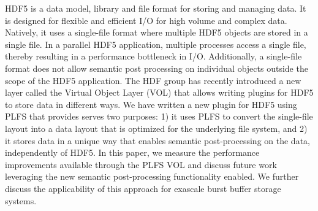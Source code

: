 HDF5 is a data model, library and file format for storing and managing data. It is designed for flexible and efficient I/O for high volume and complex data. Natively, it uses a single-file format where multiple HDF5 objects are stored in a single file. In a parallel HDF5 application, multiple processes access a single file, thereby resulting in a performance bottleneck in I/O. Additionally, a single-file format does not allow semantic post processing on individual objects outside the scope of the HDF5 application. The HDF group has recently introduced a new layer called the Virtual Object Layer (VOL) that allows writing plugins for HDF5 to store data in different ways. We have written a new plugin for HDF5 using PLFS that provides serves two purposes: 1) it uses PLFS to convert the single-file layout into a data layout that is optimized for the underlying file system, and 2) it stores data in a unique way that enables semantic post-processing on the data, independently of HDF5. In this paper, we measure the performance improvements available through the PLFS VOL and discuss future work leveraging the new semantic post-processing functionality enabled.  We further discuss the applicability of this approach for exascale burst buffer storage systems.


